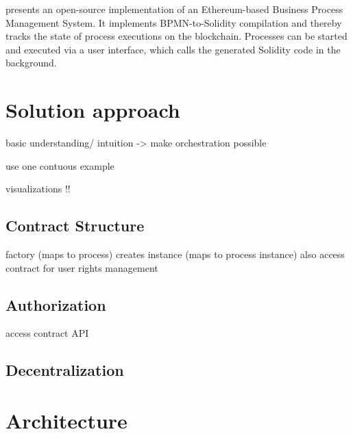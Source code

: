 \documentclass[runningheads]{llncs}
\begin{document}


\cite{lopez2017caterpillar} presents an open-source implementation of an Ethereum-based Business Process Management System.
It implements BPMN-to-Solidity compilation and thereby tracks the state of process executions on the blockchain.
Processes can be started and executed via a user interface, which calls the generated Solidity code in the background.


\section{Solution approach}

basic understanding/ intuition
-> make orchestration possible

use one contuous example

visualizations !!

\subsection{Contract Structure}

factory (maps to process)
creates instance (maps to process instance)
also access contract for user rights management

\subsection{Authorization}

access contract API

\subsection{Decentralization}

\section{Architecture}
\end{document}
